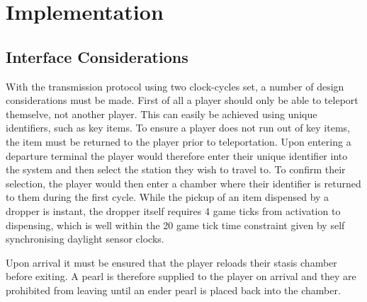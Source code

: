\documentclass[a4paper,10pt]{article}
\begin{document}
\section{Implementation}

\subsection{Interface Considerations}

With the transmission protocol using two clock-cycles set, a number of design considerations must be made.
First of all a player should only be able to teleport themselve, not another player.
This can easily be achieved using unique identifiers, such as key items.
To ensure a player does not run out of key items, the item must be returned to the player prior to teleportation.
Upon entering a departure terminal the player would therefore enter their unique identifier into the system and then select the station they wish to travel to.
To confirm their selection, the player would then enter a chamber where their identifier is returned to them during the first cycle. While the pickup of an item dispensed by a dropper is instant, the dropper itself requires 4 game ticks from activation to dispensing, which is well within the 20 game tick time constraint given by self synchronising daylight sensor clocks.

Upon arrival it must be ensured that the player reloads their stasis chamber before exiting. A pearl is therefore supplied to the player on arrival and they are prohibited from leaving until an ender pearl is placed back into the chamber.

\printbibliography

\listoffigures
\end{document}
